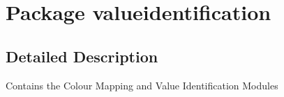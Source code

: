\hypertarget{namespacevalueidentification}{}\section{Package valueidentification}
\label{namespacevalueidentification}


\subsection{Detailed Description}
Contains the Colour Mapping and Value Identification Modules 